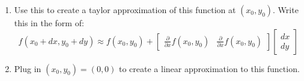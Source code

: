 \documentclass[12pt]{article}
\begin{document}
\begin{enumerate}
\begin{enumerate}
    \item Use this to create a taylor approximation of this function at $(x_0, y_0)$. Write this in the form of:
    $$
      f(x_0 + dx, y_0 + dy) \approx f(x_0, y_0) + \begin{bmatrix}\frac{\partial}{\partial x} f(x_0,y_0) & \frac{\partial}{\partial x} f(x_0,y_0)\end{bmatrix} \begin{bmatrix}dx \\ dy\end{bmatrix}
    $$

    \item Plug in $(x_0, y_0) = (0, 0)$ to create a linear approximation to this function.
  \end{enumerate}
\end{enumerate}
\end{document}
